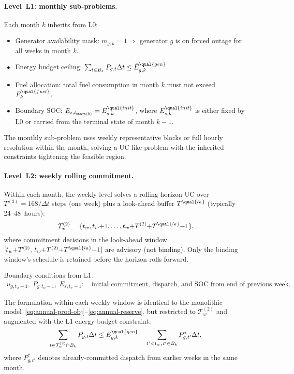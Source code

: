 \paragraph{Level~L1: monthly sub-problems.}
Each month \(k\) inherits from L0:
\begin{itemize}
\item Generator availability mask: \(m_{g,k}=1 \Rightarrow\) generator \(g\) is
  on forced outage for all weeks in month \(k\).
\item Energy budget ceiling: \(\sum_{t\in B_k} P_{g,t}\Delta t \le \bar E_{g,k}^{\qual{gen}}\).
\item Fuel allocation: total fuel consumption in month \(k\) must not exceed
  \(F_k^{\qual{fuel}}\).
\item Boundary SOC: \(E_{s,t_{\mathrm{start}(k)}} = E_{s,k}^{\qual{init}}\),
  where \(E_{s,k}^{\qual{init}}\) is either fixed by L0 or carried from the
  terminal state of month \(k{-}1\).
\end{itemize}
The monthly sub-problem uses weekly representative blocks or full hourly
resolution within the month, solving a UC-like problem with the inherited
constraints tightening the feasible region.

\paragraph{Level~L2: weekly rolling commitment.}
Within each month, the weekly level solves a rolling-horizon UC over
\(T^{(2)}=168/\Delta t\) steps (one week) plus a look-ahead buffer
\(T^{\qual{la}}\) (typically 24--48~hours):
\begin{align}
\mathcal{T}^{(2)}_w = \{t_w, t_w{+}1, \dots, t_w{+}T^{(2)}{+}T^{\qual{la}}{-}1\},
\label{eq:annual-l2-horizon}
\end{align}
where commitment decisions in the look-ahead window \([t_w{+}T^{(2)},\,
t_w{+}T^{(2)}{+}T^{\qual{la}}{-}1]\) are advisory (not binding).  Only the
binding window's schedule is retained before the horizon rolls forward.

Boundary conditions from L1:
\begin{align}
u_{g,t_w{-}1},\; P_{g,t_w{-}1},\; E_{s,t_w{-}1}: \quad
\text{initial commitment, dispatch, and SOC from end of previous week.}
\label{eq:annual-l2-boundary}
\end{align}

The formulation within each weekly window is identical to the monolithic
model~\eqref{eq:annual-prod-obj}--\eqref{eq:annual-reserve}, but restricted to
\(\mathcal{T}^{(2)}_w\) and augmented with the L1 energy-budget constraint:
\begin{align}
\sum_{t\in\mathcal{T}^{(2)}_w\cap B_k} P_{g,t}\Delta t
\le \bar E_{g,k}^{\qual{gen}} - \sum_{t'<t_w,\, t'\in B_k} P_{g,t'}^{*}\Delta t,
\label{eq:annual-l2-budget-coupling}
\end{align}
where \(P_{g,t'}^{*}\) denotes already-committed dispatch from earlier weeks in
the same month.

